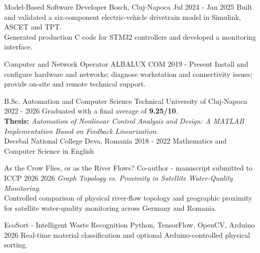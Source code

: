 \documentclass[10pt]{spidercv}
\begin{document}

\begin{MainPart}

  \Experience
    {\ColorHighlight}
    {Model-Based Software Developer}
    {Bosch, Cluj-Napoca}
    {\textcolor{\ColorTextMain}{Jul 2024 - Jan 2025}}
    {Built and validated a six-component electric-vehicle drivetrain model in Simulink, ASCET and TPT.\\
     Generated production C code for STM32 controllers and developed a monitoring interface.}

  \Experience
    {\ColorHighlight}
    {Computer and Network Operator}
    {ALBALUX COM}
    {\textcolor{\ColorTextMain}{2019 - Present}}
    {Install and configure hardware and networks; diagnose workstation and connectivity issues; provide on-site and remote technical support.}

  \Experience
    {\ColorHighlight}
    {B.Sc. Automation and Computer Science}
    {Technical University of Cluj-Napoca}
    {\textcolor{\ColorTextMain}{2022 - 2026}}
    {Graduated with a final average of \textbf{9.25/10}.\\
     \textbf{Thesis:} \textit{Automation of Nonlinear Control Analysis and Design: A MATLAB Implementation Based on Feedback Linearization}.\\
    }
  \Experience
    {\ColorHighlight}
    {Decebal National College}
    {Deva, Romania}
    {\textcolor{\ColorTextMain}{2018 - 2022}}
    {Mathematics and Computer Science in English}

  \Experience
    {\ColorHighlight}
    {As the Crow Flies, or as the River Flows?}
    {Co-author - manuscript submitted to ICCP 2026}
    {\textcolor{\ColorTextMain}{2026}}
    {\textit{Graph Topology vs. Proximity in Satellite Water-Quality Monitoring}.\\
     Controlled comparison of physical river-flow topology and geographic proximity for satellite water-quality monitoring across Germany and Romania.}

  \Experience
    {\ColorHighlight}
    {EcoSort - Intelligent Waste Recognition}
    {Python, TensorFlow, OpenCV, Arduino}
    {\textcolor{\ColorTextMain}{2026}}
    {Real-time material classification and optional Arduino-controlled physical sorting.}


\end{MainPart}
\end{document}
